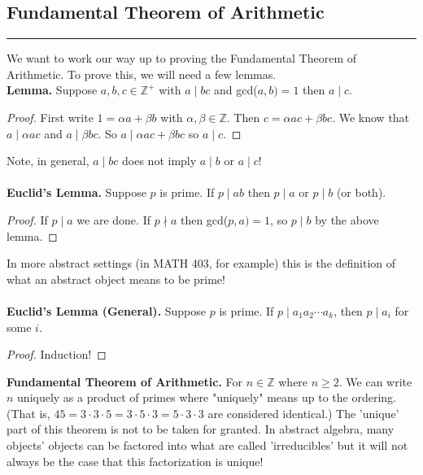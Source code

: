 \documentclass[class=article, crop=false]{standalone}
\def\integers{{\mathbb Z}}
\begin{document}
\subsection{Fundamental Theorem of Arithmetic}
\rule{\textwidth}{1pt}
We want to work our way up to proving the Fundamental Theorem of Arithmetic. To prove this, we will need a few
lemmas.\\
\textbf{Lemma.} Suppose $a,b,c\in\integers^+$ with $a\mid bc$ and gcd($a,b)=1$ then $a\mid c$.
\begin{proof}
	First write $1=\alpha a+\beta b$ with $\alpha,\beta\in\integers$. Then $c=\alpha ac+ \beta bc$. We know that
	$a\mid \alpha ac$ and $a\mid\beta bc$. So $a\mid\alpha ac+ \beta bc$ so $a\mid c$.
\end{proof}
\noindent Note, in general, $a\mid bc$ does not imply $a\mid b$ or $a\mid c$!\\\\
\textbf{Euclid's Lemma.} Suppose $p$ is prime. If $p\mid ab$ then $p\mid a$ or $p\mid b$ (or both).
\begin{proof}
	If $p\mid a$ we are done. If $p\nmid a$ then gcd($p,a)=1$, so $p\mid b$ by the above lemma.
\end{proof}
\noindent In more abstract settings (in MATH 403, for example) this is the definition of what an abstract object
means to be prime!\\\\
\textbf{Euclid's Lemma (General).} Suppose $p$ is prime. If $p\mid a_1a_2\cdots a_k$, then $p\mid a_i$ for some $i$.
\begin{proof}
	Induction!
\end{proof}
\noindent\textbf{Fundamental Theorem of Arithmetic.} For $n\in\integers$ where $n\geq 2$. We can write $n$ uniquely as a 
product of primes where "uniquely" means up to the ordering. (That is, $45=3\cdot 3\cdot5=3\cdot5\cdot3=5\cdot3\cdot3$ are
considered identical.) The 'unique' part of this theorem is not to be taken for granted. In abstract algebra, many objects'
objects can be factored into what are called 'irreducibles' but it will not always be the case that this factorization is unique!
\end{document}

